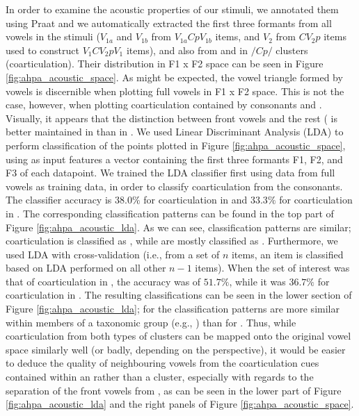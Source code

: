 In order to examine the acoustic properties of our stimuli, we annotated them using Praat \cite{praat} and we automatically extracted the first three formants from all vowels in the stimuli ($V_{1a}$ and $V_{1b}$ from $V_{1a}CpV_{1b}$ items, and $V_{2}$ from $CV_{2}p$ items used to construct $V_{1}CV_{2}pV_{1}$ items), and also from  and  in $/Cp/$ clusters (coarticulation). Their distribution in F1 x F2 space can be seen in Figure \ref{fig:ahpa_acoustic_space}.
As might be expected, the vowel triangle formed by vowels  is discernible when plotting full vowels in F1 x F2 space. This is not the case, however, when plotting coarticulation contained by consonants  and . Visually, it appears that the distinction between front vowels  and the rest ( is better maintained in  than in .
We used Linear Discriminant Analysis (LDA) to perform classification of the points plotted in Figure \ref{fig:ahpa_acoustic_space}, using as input features a vector containing the first three formants F1, F2, and F3 of each datapoint. We trained the LDA classifier first using data from full vowels as training data, in order to classify coarticulation from the consonants. The classifier accuracy is $38.0\%$ for coarticulation in  and $33.3\%$ for coarticulation in . The corresponding classification patterns can be found in the top part of Figure \ref{fig:ahpa_acoustic_lda}. As we can see, classification patterns are similar;  coarticulation is classified as , while  are mostly classified as .
Furthermore, we used LDA with cross-validation (i.e., from a set of $n$ items, an item is classified based on LDA performed on all other $n-1$ items). When the set of interest was that of coarticulation in , the accuracy was of $51.7\%$, while it was $36.7\%$ for coarticulation in . The resulting classifications can be seen in the lower section of Figure \ref{fig:ahpa_acoustic_lda}; for  the classification patterns are more similar within members of a taxonomic group (e.g., ) than for . Thus, while coarticulation from both types of clusters can be mapped onto the original vowel space similarly well (or badly, depending on the perspective), it would be easier to deduce the quality of neighbouring vowels from the coarticulation cues contained within an  rather than a  cluster, especially with regards to the separation of the front vowels  from , as can be seen in the lower part of Figure \ref{fig:ahpa_acoustic_lda} and the right panels of Figure \ref{fig:ahpa_acoustic_space}. 

